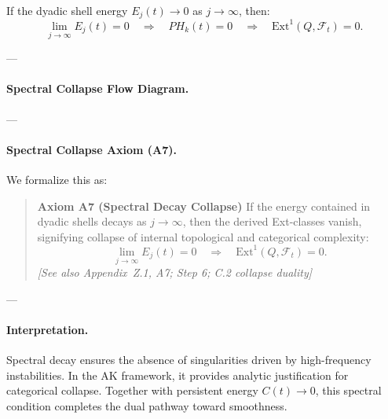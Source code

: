 \documentclass[11pt]{article}
\begin{document}
\begin{lemma}
If the dyadic shell energy \( E_j(t) \to 0 \) as \( j \to \infty \), then:
\[
\lim_{j \to \infty} E_j(t) = 0 
\quad \Rightarrow \quad 
PH_k(t) = 0 
\quad \Rightarrow \quad 
\mathrm{Ext}^1(Q, \mathcal{F}_t) = 0.
\]
\end{lemma}

---

\paragraph{Spectral Collapse Flow Diagram.}

\begin{center}
\end{center}

---

\paragraph{Spectral Collapse Axiom (A7).}
We formalize this as:

\begin{quote}
\textbf{Axiom A7 (Spectral Decay Collapse)}  
If the energy contained in dyadic shells decays as \( j \to \infty \),  
then the derived Ext-classes vanish, signifying collapse of internal topological and categorical complexity:
\[
\lim_{j \to \infty} E_j(t) = 0 
\quad \Rightarrow \quad 
\mathrm{Ext}^1(Q, \mathcal{F}_t) = 0.
\]
\textit{[See also Appendix~Z.1, A7; Step 6; C.2 collapse duality]}
\end{quote}

---

\paragraph{Interpretation.}
Spectral decay ensures the absence of singularities driven by high-frequency instabilities.  
In the AK framework, it provides analytic justification for categorical collapse.  
Together with persistent energy \( C(t) \to 0 \), this spectral condition completes the dual pathway toward smoothness.
\end{document}
